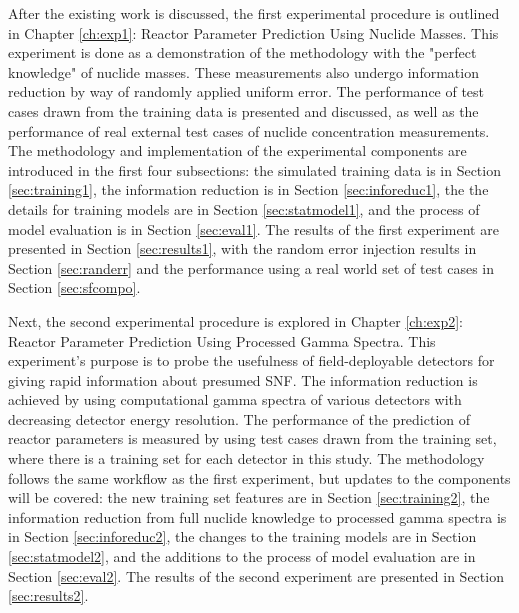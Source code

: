 After the existing work is discussed, the first experimental procedure is
outlined in Chapter \ref{ch:exp1}: Reactor Parameter Prediction Using Nuclide
Masses.  This experiment is done as a demonstration of the methodology with the
"perfect knowledge" of nuclide masses. These measurements also undergo
information reduction by way of randomly applied uniform error. The performance
of test cases drawn from the training data is presented and discussed, as well
as the performance of real external test cases of nuclide concentration
measurements.  The methodology and implementation of the experimental
components are introduced in the first four subsections: the simulated training
data is in Section \ref{sec:training1}, the information reduction is in Section
\ref{sec:inforeduc1}, the the details for training models are in Section
\ref{sec:statmodel1}, and the process of model evaluation is in Section
\ref{sec:eval1}. The results of the first experiment are presented in Section
\ref{sec:results1}, with the random error injection results in Section
\ref{sec:randerr} and the performance using a real world set of test cases in
Section \ref{sec:sfcompo}.

Next, the second experimental procedure is explored in Chapter \ref{ch:exp2}:
Reactor Parameter Prediction Using Processed Gamma Spectra.  This experiment's
purpose is to probe the usefulness of field-deployable detectors for giving
rapid information about presumed \gls{SNF}. The information reduction is
achieved by using computational gamma spectra of various detectors with
decreasing detector energy resolution.  The performance of the prediction of
reactor parameters is measured by using test cases drawn from the training set,
where there is a training set for each detector in this study.  The methodology
follows the same workflow as the first experiment, but updates to the
components will be covered: the new training set features are in Section
\ref{sec:training2}, the information reduction from full nuclide knowledge to
processed gamma spectra is in Section \ref{sec:inforeduc2}, the changes to the
training models are in Section \ref{sec:statmodel2}, and the additions to the
process of model evaluation are in Section \ref{sec:eval2}.  The results of the
second experiment are presented in Section \ref{sec:results2}.


